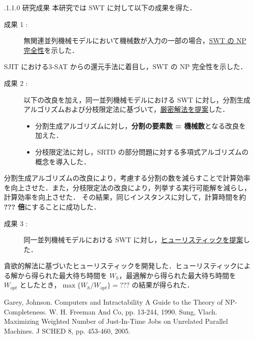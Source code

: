 \documentclass[oneside, 10pt, twocolumn]{jarticle}
\makeatletter
\def\section{\@startsection {section}{1}{\z@}{-3.5ex plus -1ex minus
-.2ex}{2.3 ex plus .2ex}{\large\bf}}
\renewcommand{\section}{
\@startsection{section}{1}{\z@}
{.1\Cvs \@plus.0\Cdp \@minus.1\Cdp}%
{.1\Cvs \@plus.1\Cdp \@minus.0\Cdp}%
{\reset@font\large\bfseries}}      %
\makeatother
\begin{document}
\section{研究成果}
本研究では SWT に対して以下の成果を得た．
\begin{description}
  \item[成果 1 : ]
  無関連並列機械モデルにおいて機械数が入力の一部の場合，\underline{SWT の NP 完全性}を示した．
\end{description}
SJIT における\textsc{3-SAT} からの還元手法に着目し，SWT の NP 完全性を示した．

\begin{description}
  \item[成果 2 : ]
  以下の改良を加え，同一並列機械モデルにおける SWT に対し，分割生成アルゴリズムおよび分枝限定法に基づいて，\underline{厳密解法を提案}した．
  \begin{itemize}
    \setlength{\leftskip}{-10mm}
    \item 分割生成アルゴリズムに対し，{\bf 分割の要素数 = 機械数}となる改良を加えた．
    \item 分枝限定法に対し，SRTD の部分問題に対する多項式アルゴリズムの概念を導入した．
  \end{itemize}
\end{description}
分割生成アルゴリズムの改良により，考慮する分割の数を減らすことで計算効率を向上させた．また，分枝限定法の改良により，列挙する実行可能解を減らし，計算効率を向上させた．
その結果，同じインスタンスに対して，計算時間を約 {\bf ??? 倍}にすることに成功した．

\begin{description}
  \item[成果 3 : ]
  同一並列機械モデルにおける SWT に対し，\underline{ヒューリスティックを提案}した．
\end{description}
貪欲的解法に基づいたヒューリスティックを開発した．ヒューリスティックによる解から得られた最大待ち時間を $W_h$，最適解から得られた最大待ち時間を $W_{opt}$ としたとき，\mbox{\boldmath $\max\big\{W_h/W_{opt}\big\} = ???$} の結果が得られた．

\begin{thebibliography}{9} %
  Garey, Johnson.
  Computers and Intractability A Guide to the Theory of NP-Completeness.
  W. H. Freeman And Co, pp. 13-244, 1990.
  \vspace{-2mm}
  Sung, Vlach.
  Maximizing Weighted Number of Just-In-Time Jobs on Unrelated Parallel Machines. J SCHED 8, pp. 453-460, 2005.
\end{thebibliography}
\end{document}
